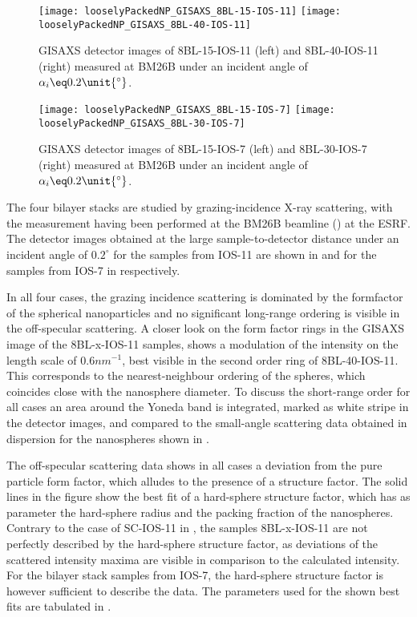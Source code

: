 \documentclass[\main/dresen_thesis.tex]{subfiles}
\begin{document}
  \label{sec:looselyPackedNS:bilayerStacks:gisaxs}
  \begin{figure}[tb]
    \centering
    \texttt{[image: looselyPackedNP\_GISAXS\_8BL-15-IOS-11]}
    \texttt{[image: looselyPackedNP\_GISAXS\_8BL-40-IOS-11]}
    \caption{\label{fig:looselyPackedNP:bilayerStacks:gisaxs8BL_IOS_11}GISAXS detector images of 8BL-15-IOS-11 (left)  and 8BL-40-IOS-11 (right) measured at BM26B under an incident angle of $\alpha_i \eq 0.2 \unit{^\circ}$.}
  \end{figure}

  \begin{figure}[tb]
    \centering
    \texttt{[image: looselyPackedNP\_GISAXS\_8BL-15-IOS-7]}
    \texttt{[image: looselyPackedNP\_GISAXS\_8BL-30-IOS-7]}
    \caption{\label{fig:looselyPackedNP:bilayerStacks:gisaxs8BL_IOS_7}GISAXS detector images of 8BL-15-IOS-7 (left)  and 8BL-30-IOS-7 (right) measured at BM26B under an incident angle of $\alpha_i \eq 0.2 \unit{^\circ}$.}
  \end{figure}

  The four bilayer stacks are studied by grazing-incidence X-ray scattering, with the measurement having been performed at the BM26B beamline () at the ESRF.
  The detector images obtained at the large sample-to-detector distance under an incident angle of $0.2 ^\circ$ for the samples from IOS-11 are shown in  and for the samples from IOS-7 in  respectively.

  In all four cases, the grazing incidence scattering is dominated by the formfactor of the spherical nanoparticles and no significant long-range ordering is visible in the off-specular scattering.
  A closer look on the form factor rings in the GISAXS image of the 8BL-x-IOS-11 samples, shows a modulation of the intensity on the length scale of $0.6 \unit{nm^{-1}}$, best visible in the second order ring of 8BL-40-IOS-11.
  This corresponds to the nearest-neighbour ordering of the spheres, which coincides close with the nanosphere diameter.
  To discuss the short-range order for all cases an area around the Yoneda band is integrated, marked as white stripe in the detector images, and compared to the small-angle scattering data obtained in dispersion for the nanospheres shown in .

  The off-specular scattering data shows in all cases a deviation from the pure particle form factor, which alludes to the presence of a structure factor.
  The solid lines in the figure show the best fit of a hard-sphere structure factor, which has as parameter the hard-sphere radius and the packing fraction of the nanospheres.
  Contrary to the case of SC-IOS-11 in , the samples 8BL-x-IOS-11 are not perfectly described by the hard-sphere structure factor, as deviations of the scattered intensity maxima are visible in comparison to the calculated intensity.
  For the bilayer stack samples from IOS-7, the hard-sphere structure factor is however sufficient to describe the data.
  The parameters used for the shown best fits are tabulated in .
\end{document}
